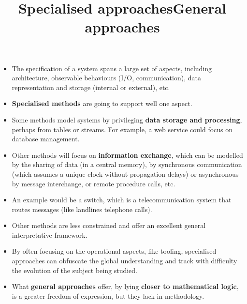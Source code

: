 \documentclass[wide]{slides}
\begin{document}
\begin{slide}
  \title{Specialised approaches}

  \begin{itemize}

    \item The specification of a system spans a large set of aspects,
      including architecture, observable behaviours (I/O,
      communication), data representation and storage (internal or
      external), etc.

    \item \textbf{Specialised methods} are going to support well one
      aspect.

    \item Some methods model systems by privileging \textbf{data
      storage and processing}, perhaps from tables or streams. For
      example, a web service could focus on database management.

    \item Other methods will focus on \textbf{information exchange},
      which can be modelled by the sharing of data (in a central
      memory), by synchronous communication (which assumes a unique
      clock without propagation delays) or asynchronous by message
      interchange, or remote procedure calls, etc.

    \item An example would be a switch, which is a telecommunication
      system that routes messages (like landlines telephone calls).

  \end{itemize}

\end{slide}

\begin{slide}
  \title{General approaches}

  \begin{itemize}

    \item Other methods are less constrained and offer an excellent
      general interpretative framework.

    \item By often focusing on the operational aspects, like tooling,
      specialised approaches can obfuscate the global understanding
      and track with difficulty the evolution of the subject being
      studied.

    \item What \textbf{general approaches} offer, by lying
      \textbf{closer to mathematical logic}, is a greater freedom of
      expression, but they lack in methodology.

  \end{itemize}
\end{slide}
\end{document}
